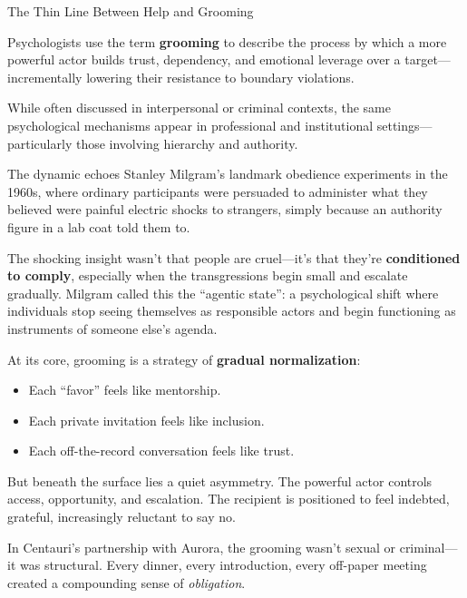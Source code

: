 \begin{PsychologicalSidebar}{The Thin Line Between Help and Grooming}

    Psychologists use the term \textbf{grooming} to describe the process by which a more powerful actor builds trust, 
    dependency, and emotional leverage over a target—incrementally lowering their resistance to boundary violations.
  
    \medskip
  
    While often discussed in interpersonal or criminal contexts, the same psychological mechanisms appear in 
    professional and institutional settings—particularly those involving hierarchy and authority.
  
    \medskip
  
    The dynamic echoes Stanley Milgram’s landmark obedience experiments in the 1960s, where ordinary participants were 
    persuaded to administer what they believed were painful electric shocks to strangers, simply because an authority 
    figure in a lab coat told them to.
  
    \medskip
  
    The shocking insight wasn’t that people are cruel—it’s that they’re \textbf{conditioned to comply}, especially 
    when the transgressions begin small and escalate gradually. Milgram called this the “agentic state”: a psychological 
    shift where individuals stop seeing themselves as responsible actors and begin functioning as instruments of 
    someone else’s agenda.
  
    \medskip
  
    At its core, grooming is a strategy of \textbf{gradual normalization}:
  
    \begin{itemize}
      \item Each “favor” feels like mentorship.  
      \item Each private invitation feels like inclusion.  
      \item Each off-the-record conversation feels like trust.
    \end{itemize}
  
    \medskip
  
    But beneath the surface lies a quiet asymmetry. The powerful actor controls access, opportunity, and escalation. 
    The recipient is positioned to feel indebted, grateful, increasingly reluctant to say no.
  
    \medskip
  
    In Centauri’s partnership with Aurora, the grooming wasn’t sexual or criminal—it was structural. Every dinner, every 
    introduction, every off-paper meeting created a compounding sense of \emph{obligation}.
  

\end{PsychologicalSidebar}
